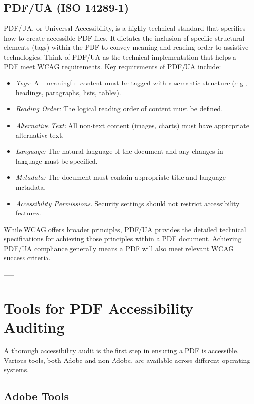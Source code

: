 \subsection{PDF/UA (ISO 14289-1)}
\label{subsec:pdfua}
PDF/UA, or Universal Accessibility, is a highly technical standard that specifies how to create accessible PDF files. It dictates the inclusion of specific structural elements (tags) within the PDF to convey meaning and reading order to assistive technologies. Think of PDF/UA as the technical implementation that helps a PDF meet WCAG requirements.\cite{AdobePDFUA} Key requirements of PDF/UA include:
\begin{itemize}
\item \emph{Tags:} All meaningful content must be tagged with a semantic structure (e.g., headings, paragraphs, lists, tables).
\item \emph{Reading Order:} The logical reading order of content must be defined.
\item \emph{Alternative Text:} All non-text content (images, charts) must have appropriate alternative text.
\item \emph{Language:} The natural language of the document and any changes in language must be specified.
\item \emph{Metadata:} The document must contain appropriate title and language metadata.
\item \emph{Accessibility Permissions:} Security settings should not restrict accessibility features.
\end{itemize}
While WCAG offers broader principles, PDF/UA provides the detailed technical specifications for achieving those principles within a PDF document. Achieving PDF/UA compliance generally means a PDF will also meet relevant WCAG success criteria.\cite{PubComWCAGvsPDFUA}

-----

\section{Tools for PDF Accessibility Auditing}
\label{sec:tools-auditing}
A thorough accessibility audit is the first step in ensuring a PDF is accessible. Various tools, both Adobe and non-Adobe, are available across different operating systems.

\subsection{Adobe Tools}
\label{subsec:adobe-tools}
